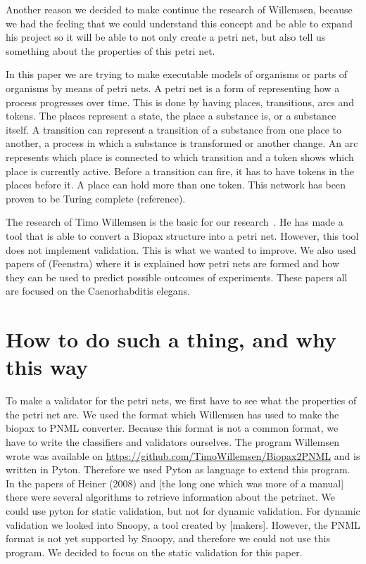 \documentclass[12pt,a4paper,draft]{article}
\begin{document}
    Another reason we decided to make continue the research of Willemsen, because we had the feeling that we could understand this concept and be able to expand his project so it will be able to not only create a petri net, but also tell us something about the properties of this petri net.
    
    In this paper we are trying to make executable models of organisms or parts of organisms by means of petri nets. A petri net is a form of representing how a process progresses over time. This is done by having places, transitions, arcs and tokens. The places represent a state, the place a substance is, or a substance itself. A transition can represent a transition of a substance from one place to another, a process in which a substance is transformed or another change. An arc represents which place is connected to which transition and a token shows which place is currently active. Before a transition can fire, it has to have tokens in the places before it. A place can hold more than one token. This network has been proven to be Turing complete (reference).
    
    The research of Timo Willemsen is the basic for our research~\cite{Willemsen2013}. He has made a tool that is able to convert a Biopax structure into a petri net. However, this tool does not implement validation. This is what we wanted to improve. We also used papers of
    (Feenstra) where it is explained how petri nets are formed and how they can be used to predict possible outcomes of experiments. These papers all are focused on the Caenorhabditis elegans.
    
\section{How to do such a thing, and why this way}\label{sec:methods}

    To make a validator for the petri nets, we first have to see what the properties of the petri net are. We used the format which Willemsen has used to make the biopax to PNML converter. Because this format is not a common format, we have to write the classifiers and validators ourselves. The program Willemsen wrote was available on \url{https://github.com/TimoWillemsen/Biopax2PNML} and is written in Pyton. Therefore we used Pyton as language to extend this program. In the papers of Heiner (2008) and [the long one which was more of a manual] there were several algorithms to retrieve information about the petrinet. We could use pyton for static validation, but not for dynamic validation. For dynamic validation we looked into Snoopy, a tool created by [makers]. However, the PNML format is not yet supported by Snoopy, and therefore we could not use this program. We decided to focus on the static validation for this paper.
    
\end{document}
